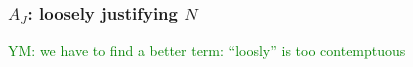\documentclass[preprint, french, english, 11pt, authoryear]{elsarticle}%
\newcommand{\protectforpdf}[1]{\texorpdfstring{\ensuremath{#1}}{#1}}
\newcommand{\commentYM}[1]{\textcolor{green}{YM: #1}}
\begin{document}
\begin{changebar}
\subsubsection{\texorpdfstring{$A_J$}{AJ}: loosely justifying \protectforpdf{N}}
\commentYM{we have to find a better term: ``loosly'' is too contemptuous}



\end{changebar}
\end{document}
